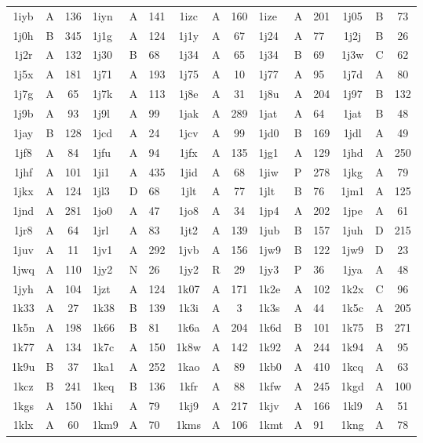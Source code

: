 \begin{longtable}{|c|c|c| a|a|a| c|c|c| a|a|a| c|c|c|}
1iyb & A & 136 & 1iyn & A & 141 & 1izc & A & 160 & 1ize & A & 201 & 1j05 & B & 73\\
1j0h & B & 345 & 1j1g & A & 124 & 1j1y & A & 67 & 1j24 & A & 77 & 1j2j & B & 26\\
1j2r & A & 132 & 1j30 & B & 68 & 1j34 & A & 65 & 1j34 & B & 69 & 1j3w & C & 62\\
1j5x & A & 181 & 1j71 & A & 193 & 1j75 & A & 10 & 1j77 & A & 95 & 1j7d & A & 80\\
1j7g & A & 65 & 1j7k & A & 113 & 1j8e & A & 31 & 1j8u & A & 204 & 1j97 & B & 132\\
1j9b & A & 93 & 1j9l & A & 99 & 1jak & A & 289 & 1jat & A & 64 & 1jat & B & 48\\
1jay & B & 128 & 1jcd & A & 24 & 1jcv & A & 99 & 1jd0 & B & 169 & 1jdl & A & 49\\
1jf8 & A & 84 & 1jfu & A & 94 & 1jfx & A & 135 & 1jg1 & A & 129 & 1jhd & A & 250\\
1jhf & A & 101 & 1ji1 & A & 435 & 1jid & A & 68 & 1jiw & P & 278 & 1jkg & A & 79\\
1jkx & A & 124 & 1jl3 & D & 68 & 1jlt & A & 77 & 1jlt & B & 76 & 1jm1 & A & 125\\
1jnd & A & 281 & 1jo0 & A & 47 & 1jo8 & A & 34 & 1jp4 & A & 202 & 1jpe & A & 61\\
1jr8 & A & 64 & 1jrl & A & 83 & 1jt2 & A & 139 & 1jub & B & 157 & 1juh & D & 215\\
1juv & A & 11 & 1jv1 & A & 292 & 1jvb & A & 156 & 1jw9 & B & 122 & 1jw9 & D & 23\\
1jwq & A & 110 & 1jy2 & N & 26 & 1jy2 & R & 29 & 1jy3 & P & 36 & 1jya & A & 48\\
1jyh & A & 104 & 1jzt & A & 124 & 1k07 & A & 171 & 1k2e & A & 102 & 1k2x & C & 96\\
1k33 & A & 27 & 1k38 & B & 139 & 1k3i & A & 3 & 1k3s & A & 44 & 1k5c & A & 205\\
1k5n & A & 198 & 1k66 & B & 81 & 1k6a & A & 204 & 1k6d & B & 101 & 1k75 & B & 271\\
1k77 & A & 134 & 1k7c & A & 150 & 1k8w & A & 142 & 1k92 & A & 244 & 1k94 & A & 95\\
1k9u & B & 37 & 1ka1 & A & 252 & 1kao & A & 89 & 1kb0 & A & 410 & 1kcq & A & 63\\
1kcz & B & 241 & 1keq & B & 136 & 1kfr & A & 88 & 1kfw & A & 245 & 1kgd & A & 100\\
1kgs & A & 150 & 1khi & A & 79 & 1kj9 & A & 217 & 1kjv & A & 166 & 1kl9 & A & 51\\
1klx & A & 60 & 1km9 & A & 70 & 1kms & A & 106 & 1kmt & A & 91 & 1kng & A & 78\\

\end{longtable}
